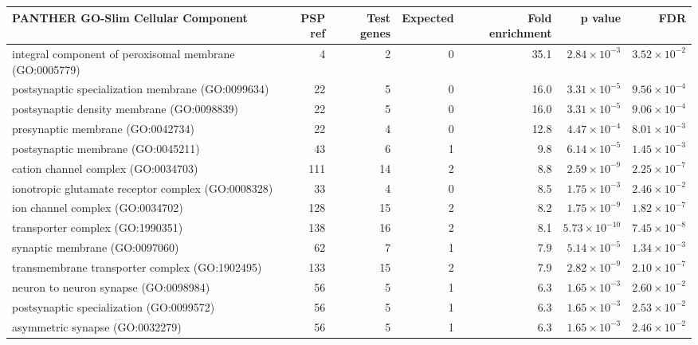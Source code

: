 \begin{table}[ht]
\centering
\begin{adjustbox}{width=\textwidth}

\begin{tabular}{lrrrrrr}
  \hline
PANTHER GO-Slim Cellular Component & PSP ref & Test genes & Expected & Fold enrichment & p value & FDR \\ 
  \hline
integral component of peroxisomal membrane (GO:0005779) & 4 & 2 & 0 & 35.1 & $2.84 \times 10^{-3}$ & $3.52 \times 10^{-2}$ \\ 
  postsynaptic specialization membrane (GO:0099634) & 22 & 5 & 0 & 16.0 & $3.31 \times 10^{-5}$ & $9.56 \times 10^{-4}$ \\ 
  postsynaptic density membrane (GO:0098839) & 22 & 5 & 0 & 16.0 & $3.31 \times 10^{-5}$ & $9.06 \times 10^{-4}$ \\ 
  presynaptic membrane (GO:0042734) & 22 & 4 & 0 & 12.8 & $4.47 \times 10^{-4}$ & $8.01 \times 10^{-3}$ \\ 
  postsynaptic membrane (GO:0045211) & 43 & 6 & 1 & 9.8 & $6.14 \times 10^{-5}$ & $1.45 \times 10^{-3}$ \\ 
  cation channel complex (GO:0034703) & 111 & 14 & 2 & 8.8 & $2.59 \times 10^{-9}$ & $2.25 \times 10^{-7}$ \\ 
  ionotropic glutamate receptor complex (GO:0008328) & 33 & 4 & 0 & 8.5 & $1.75 \times 10^{-3}$ & $2.46 \times 10^{-2}$ \\ 
  ion channel complex (GO:0034702) & 128 & 15 & 2 & 8.2 & $1.75 \times 10^{-9}$ & $1.82 \times 10^{-7}$ \\ 
  transporter complex (GO:1990351) & 138 & 16 & 2 & 8.1 & $5.73 \times 10^{-10}$ & $7.45 \times 10^{-8}$ \\ 
  synaptic membrane (GO:0097060) & 62 & 7 & 1 & 7.9 & $5.14 \times 10^{-5}$ & $1.34 \times 10^{-3}$ \\ 
  transmembrane transporter complex (GO:1902495) & 133 & 15 & 2 & 7.9 & $2.82 \times 10^{-9}$ & $2.10 \times 10^{-7}$ \\ 
  neuron to neuron synapse (GO:0098984) & 56 & 5 & 1 & 6.3 & $1.65 \times 10^{-3}$ & $2.60 \times 10^{-2}$ \\ 
  postsynaptic specialization (GO:0099572) & 56 & 5 & 1 & 6.3 & $1.65 \times 10^{-3}$ & $2.53 \times 10^{-2}$ \\ 
  asymmetric synapse (GO:0032279) & 56 & 5 & 1 & 6.3 & $1.65 \times 10^{-3}$ & $2.46 \times 10^{-2}$ \\ 

\end{tabular}
\end{adjustbox}
\end{table}
